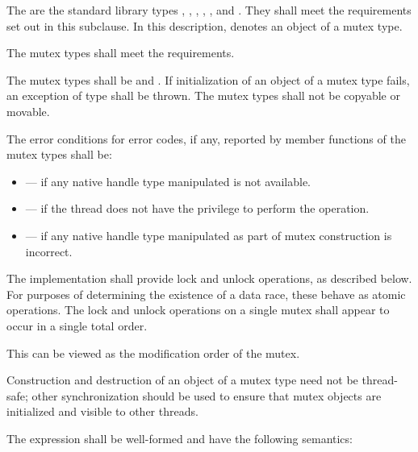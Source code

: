 \pnum
The  are the standard library types ,
, , ,
, and .
They shall meet the requirements set out in this subclause. In this description, 
denotes an object of a mutex type.

\pnum
The mutex types shall meet the  requirements.

\pnum
The mutex types shall be  and . If
initialization of an object of a mutex type fails, an exception of type
 shall be thrown. The mutex types shall not be copyable or movable.

\pnum
The error conditions for error codes, if any, reported by member functions of the mutex types
shall be:
\begin{itemize}
\item {} --- if any native handle type manipulated is not available.
\item {} --- if the thread does not have the
privilege to perform the operation.
\item {} --- if any native handle type manipulated as part of mutex
construction is incorrect.
\end{itemize}

\pnum
The implementation shall provide lock and unlock operations, as described below.
For purposes of determining the existence of a data race, these behave as
atomic operations. The lock and unlock operations on
a single mutex shall appear to occur in a single total order.
\begin{note}
This
can be viewed as the modification order of the
mutex.
\end{note}
\begin{note}
Construction and
destruction of an object of a mutex type need not be thread-safe; other
synchronization should be used to ensure that mutex objects are initialized
and visible to other threads.
\end{note}

\pnum
The expression  shall be well-formed and have the following semantics:

